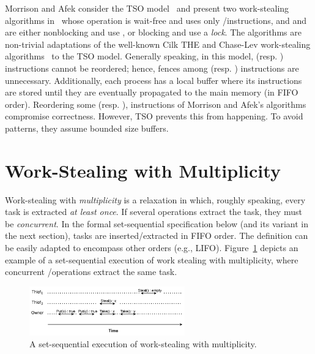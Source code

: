 Morrison and Afek consider the TSO model~\cite{DBLP_journals_cacm_SewellSONM10} and present two work-stealing algorithms in~\cite{fencefreework} whose \Put operation is wait-free and uses only \R/\W instructions,  and \Take and \Steal are either nonblocking and use \CAS, or blocking and use a \emph{lock}. The algorithms are non-trivial adaptations of the well-known Cilk THE and Chase-Lev work-stealing algorithms~\cite{circular.work.stealing, FLR98} to the TSO model. Generally speaking, in this model, \W (resp. \R) instructions cannot be reordered; hence, fences among \W (resp. \R) instructions are unnecessary. Additionally, each process has a local buffer where its \W instructions are stored until they are eventually propagated to the main memory (in FIFO order). Reordering some \W (resp. \R), instructions of Morrison and Afek's algorithms compromise correctness. However, TSO prevents this from happening. To avoid \RAW patterns, they assume bounded size \W buffers.

\section{\label{sec-ws-mult}Work-Stealing with Multiplicity}

Work-stealing with \emph{multiplicity} is a relaxation in which, roughly speaking, every task is extracted \emph{at least once}. If several operations extract the task, they must be \emph{concurrent}. In the formal set-sequential specification below (and its variant in the next section), tasks are inserted/extracted in FIFO order. The definition can be easily adapted to encompass other orders (e.g., LIFO). Figure~\ref{fig-example-execution} depicts an example of a set-sequential execution of work stealing with multiplicity, where concurrent \Take/\Steal operations extract the same task.

\begin{figure}[ht]
  \begin{center}
    \includegraphics[width=0.6\textwidth]{contents/figures/IV_1_set-linearizability.pdf}
    \caption{\label{fig-example-execution}A set-sequential execution
      of work-stealing with multiplicity.}
  \end{center}
\end{figure}

